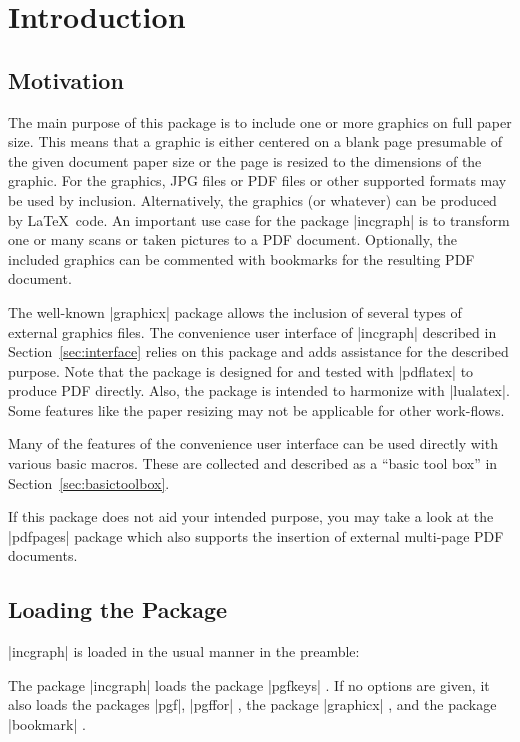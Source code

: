\documentclass[a4paper,11pt]{ltxdoc}
\begin{document}
\section{Introduction}
\subsection{Motivation}
The main purpose of this package is to include one or more graphics on full
paper size. This means that a graphic is either centered on a blank page
presumable of the given document paper size or the page is resized
to the dimensions of the graphic.
For the graphics, JPG files or PDF files or other supported formats may be
used by inclusion. Alternatively, the graphics (or whatever) can be produced
by \LaTeX\ code.
An important use case for the package |incgraph| is to transform one or many scans
or taken pictures to a PDF document. Optionally, the included graphics can
be commented with bookmarks for the resulting PDF document.

The well-known |graphicx| package \cite{package:graphicx} allows the inclusion
of several types of external graphics files. The convenience user interface
of |incgraph| described in Section~\ref{sec:interface} relies on this package and adds
assistance for the described purpose. Note that the package is designed for and
tested with |pdflatex| to produce PDF directly. Also, the package is
intended to harmonize with |lualatex|.
Some features like the paper
resizing may not be applicable for other work-flows.

Many of the features of the convenience user interface can be used directly
with various basic macros. These are collected and described
as a \enquote{basic tool box} in Section~\ref{sec:basictoolbox}.

If this package does not aid your intended purpose, you may take a look
at the |pdfpages| package \cite{package:pdfpages} which also supports the insertion of
external multi-page PDF documents.


\subsection{Loading the Package}
|incgraph| is loaded in the usual manner in the preamble:
\begin{dispListing}
\usepackage{incgraph}
\end{dispListing}

The package |incgraph| loads the package
|pgfkeys| \cite{package:tikz}. If no options are given, it also
loads the packages |pgf|, |pgffor| \cite{package:tikz},
the package |graphicx| \cite{package:graphicx}, and the
package |bookmark| \cite{package:bookmark}.
\end{document}
